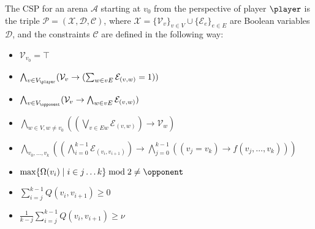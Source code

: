 \documentclass[a4paper,UKenglish,cleveref, autoref, thm-restate, anonymous]{lipics-v2021}
\begin{document}
\begin{definition}\label{def:csp}
    The CSP for an arena $\mathcal{A}$
    starting at $v_0$ from the perspective of player $\player$ is the triple $\mathcal{P} = (\mathcal{X}, \mathcal{D}, \mathcal{C})$, where $\mathcal{X} = \{ \mathcal{V}_v \}_{v \in V} \cup \{ \mathcal{E}_e \}_{e \in E}$ are Boolean variables $\mathcal{D}$, and the constraints $\mathcal{C}$ are defined in the following way:
    \begin{itemize}
        [leftmargin=3.3cm, labelwidth=2.8cm, align=right, itemsep=0.2ex, parsep=0pt, topsep=2pt]

        \item [$\mathcal{C}_{v_0}$ :] $\mathcal{V}_{v_0} = \top$

        \item [$\mathcal{C}_{\player}$ :] $\bigwedge_{v \in V_{\player}} (\mathcal{V}_v \rightarrow (\sum_{w \in vE} \mathcal{E}_{(v,w)}= 1))$

        \item [$\mathcal{C}_{\opponent}$ :] $\bigwedge_{v \in V_{\opponent}} (\mathcal{V}_v \rightarrow \bigwedge_{w \in vE} \mathcal{E}_{(v,w)})$

        \item [$\mathcal{C}_{\!E}$ :] $\bigwedge_{w \in V, w \neq v_0} ((\bigvee_{v \in Ew} \mathcal{E}_{(v,w)}) \rightarrow \mathcal{V}_w)$

        \item [$\mathcal{C}_{NOC}(f)$ :] $\bigwedge_{v_0, \dots, v_k} \left( \left(\bigwedge_{i=0}^{k-1} \mathcal{E}_{(v_i,v_{i+1})}\right) \to \bigwedge_{j=0}^{k-1} ((v_j = v_k) \to f(v_j, \dots, v_k)) \right)$

    \end{itemize}
    \begin{itemize}
        [leftmargin=3.3cm, labelwidth=2.8cm, align=right, itemsep=0.5ex, parsep=0pt, topsep=1pt]
        \item [$f_\omega(v_j, \dots, v_k) =$] $\max\{\Omega(v_i) \mid i\in j\dots k\} \bmod 2 \ne \opponent$

        \item [$f_\eta(v_j, \dots, v_k) =$] $\sum_{i=j}^{k-1} Q(v_i, v_{i+1}) \ge 0$

        \item [$f_\mu(v_j, \dots, v_k) =$] $\frac{1}{k-j} \sum_{i=j}^{k-1} Q(v_i, v_{i+1}) \ge \nu$
    \end{itemize}
\end{definition}
\end{document}
